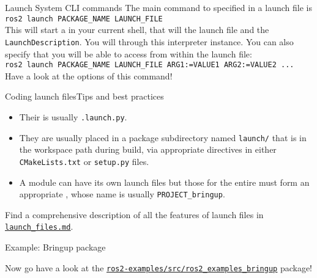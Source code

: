 \begin{frame}{Launch System CLI commands}
  The main command to  specified in a launch file is\\
  \bigskip
  \texttt{ros2 launch PACKAGE\_NAME LAUNCH\_FILE}\\
  \bigskip
  This will start a  in your current shell, that will  the launch file and  the \texttt{LaunchDescription}. You will  through this interpreter instance. You can also specify  that you will be able to access from within the launch file:\\
  \bigskip
  \texttt{ros2 launch PACKAGE\_NAME LAUNCH\_FILE ARG1:=VALUE1 ARG2:=VALUE2 ...}\\
  \bigskip
  Have a look at the options of this command!
\end{frame}

\begin{frame}{Coding launch files}{Tips and best practices}
	\begin{itemize}
		\item Their  is usually \texttt{.launch.py}.
		\item They are usually placed in a package subdirectory named \texttt{launch/} that is  in the workspace path during build, via appropriate directives in either \texttt{CMakeLists.txt} or \texttt{setup.py} files.
		\item A module can have its own launch files but those for the entire  must form an appropriate , whose name is usually \texttt{PROJECT\_bringup}.
	\end{itemize}
	\begin{block}{}
		\centering
		Find a comprehensive description of all the features of launch files in \href{https://github.com/IntelligentSystemsLabUTV/ros2-examples/blob/jazzy/launch_files.md}{\color{blue}\underline{\texttt{launch\_files.md}}}.
	\end{block}
\end{frame}

\begin{frame}{Example: Bringup package}
  \begin{block}{}
    \centering
	  Now go have a look at the \href{https://github.com/IntelligentSystemsLabUTV/ros2-examples/tree/jazzy/src/ros2_examples_bringup}{\color{blue}\underline{\texttt{ros2-examples/src/ros2\_examples\_bringup}}} package!
  \end{block}
\end{frame}
